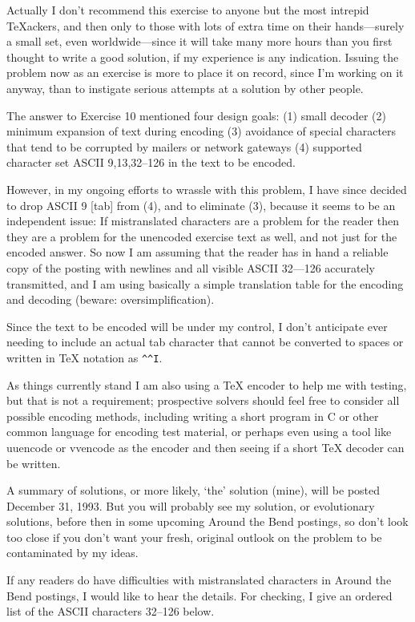 Actually I don't recommend this exercise to anyone but the most
intrepid TeXackers, and then only to those with lots of extra time on
their hands---surely a small set, even worldwide---since it will take
many more hours than you first thought to write a good solution, if my
experience is any indication. Issuing the problem now as an exercise
is more to place it on record, since I'm working on it anyway, than to
instigate serious attempts at a solution by other people.

The answer to Exercise 10 mentioned four design goals: (1) small
decoder (2) minimum expansion of text during encoding (3) avoidance of
special characters that tend to be corrupted by mailers or network
gateways (4) supported character set ASCII 9,13,32--126 in the text to
be encoded.

However, in my ongoing efforts to wrassle with this problem, I have
since decided to drop ASCII 9 [tab] from (4), and to eliminate (3),
because it seems to be an independent issue: If mistranslated
characters are a problem for the reader then they are a problem for
the unencoded exercise text as well, and not just for the encoded
answer. So now I am assuming that the reader has in hand a reliable
copy of the posting with newlines and all visible ASCII 32---126
accurately transmitted, and I am using basically a simple translation
table for the encoding and decoding (beware: oversimplification).

Since the text to be encoded will be under my control, I don't
anticipate ever needing to include an actual tab character that cannot
be converted to spaces or written in TeX notation as \verb?^^I?.

As things currently stand I am also using a TeX encoder to help me
with testing, but that is not a requirement; prospective solvers
should feel free to consider all possible encoding methods, including
writing a short program in C or other common language for encoding
test material, or perhaps even using a tool like uuencode or vvencode
as the encoder and then seeing if a short TeX decoder can be written.

A summary of solutions, or more likely, `the' solution (mine), will be
posted December 31, 1993. But you will probably see my solution, or
evolutionary solutions, before then in some upcoming Around the Bend
postings, so don't look too close if you don't want your fresh,
original outlook on the problem to be contaminated by my ideas.

If any readers do have difficulties with mistranslated characters in
Around the Bend postings, I would like to hear the details. For
checking, I give an ordered list of the ASCII characters 32--126
below.

